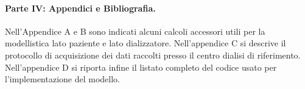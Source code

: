 \paragraph*{Parte IV: Appendici e Bibliografia.}
Nell'Appendice A e B sono indicati alcuni calcoli accessori utili per la modellistica lato paziente e lato dializzatore.
Nell'appendice C si descrive il protocollo di acquisizione dei dati raccolti presso il centro dialisi di riferimento.
Nell'appendice D si riporta infine il listato completo del codice usato per l'implementazione del modello.